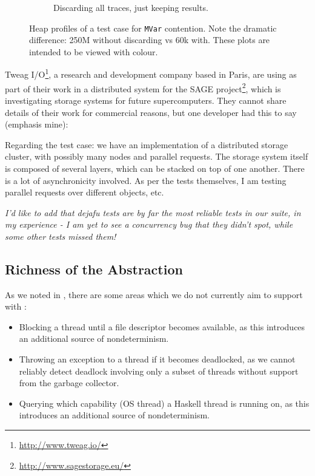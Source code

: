 \begin{figure}
\begin{subfigure}{0.49\textwidth}
    \caption{Discarding all traces, just keeping results.}
  \end{subfigure}
  \caption[Heap profiles of a test case for \texttt{MVar} contention.]{Heap profiles of a test case for \texttt{MVar} contention.  Note the dramatic difference: 250M without discarding vs 60k with.  These plots are intended to be viewed with colour.}\label{fig:discard}
\end{figure}

Tweag I/O\footnote{\url{http://www.tweag.io/}}, a research and
development company based in Paris, are using \dejafu{} as part of
their work in a distributed system for the SAGE
project\footnote{\url{http://www.sagestorage.eu/}}, which is
investigating storage systems for future supercomputers.  They cannot
share details of their work for commercial reasons, but one developer
had this to say (emphasis mine):

\begin{displayquote}
  Regarding the test case: we have an implementation of a distributed
  storage cluster, with possibly many nodes and parallel requests.
  The storage system itself is composed of several layers, which can
  be stacked on top of one another.  There is a lot of asynchronicity
  involved.  As per the tests themselves, I am testing parallel
  requests over different objects, etc.

  \emph{I'd like to add that dejafu tests are by far the most reliable
    tests in our suite, in my experience - I am yet to see a
    concurrency bug that they didn't spot, while some other tests
    missed them!}\cite{tweag2017}
\end{displayquote}

\subsection{Richness of the Abstraction}

As we noted in , there are some areas which we
do not currently aim to support with \dejafu{}:

\begin{itemize}
\item Blocking a thread until a file descriptor becomes available, as
  this introduces an additional source of nondeterminism.
\item Throwing an exception to a thread if it becomes deadlocked, as
  we cannot reliably detect deadlock involving only a subset of
  threads without support from the garbage collector.
\item Querying which capability (OS thread) a Haskell thread is
  running on, as this introduces an additional source of
  nondeterminism.
\end{itemize}

